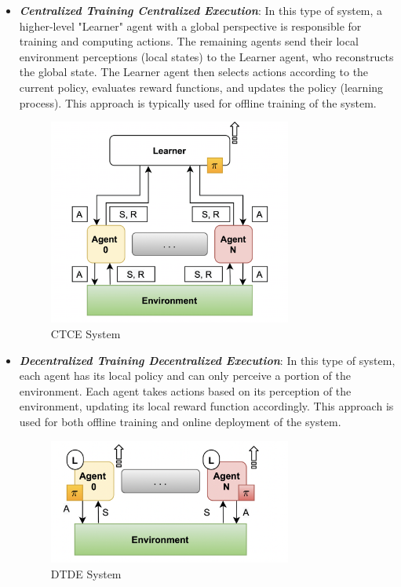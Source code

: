 \documentclass{scrartcl}
\begin{document}
\begin{itemize}
    \item \textbf{\textit{Centralized Training Centralized Execution}}: In this type of system, a higher-level "Learner" agent with a global perspective is responsible for training and computing actions. The remaining agents send their local environment perceptions (local states) to the Learner agent, who reconstructs the global state. The Learner agent then selects actions according to the current policy, evaluates reward functions, and updates the policy (learning process). This approach is typically used for offline training of the system.
    
    \begin{figure}
    \centering
    \includegraphics[width=8cm]{img/CTCE.png}
    \caption{CTCE System \cite{aguzzi}}
    \end{figure}
    
    \item \textbf{\textit{Decentralized Training Decentralized Execution}}: In this type of system, each agent has its local policy and can only perceive a portion of the environment. Each agent takes actions based on its perception of the environment, updating its local reward function accordingly. This approach is used for both offline training and online deployment of the system.
    
    \begin{figure}
    \centering
    \includegraphics[width=8cm]{img/DTDE.png}
    \caption{DTDE System \cite{aguzzi}}
    \end{figure}
    

\end{itemize}
\end{document}
